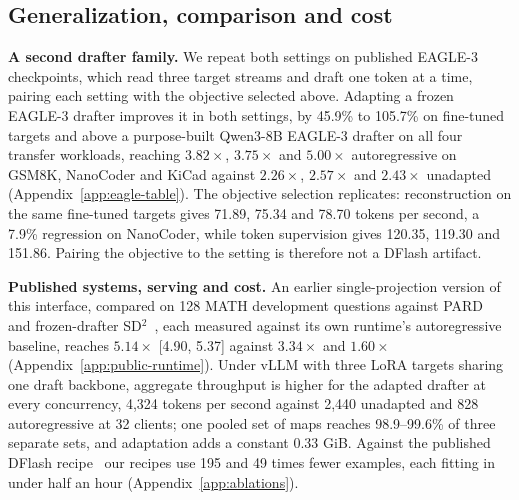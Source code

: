\subsection{Generalization, comparison and cost}
\label{sec:eagle}
\textbf{A second drafter family.} We repeat both settings on published EAGLE-3 checkpoints, which read three target streams and draft one token at a time, pairing each setting with the objective selected above. Adapting a frozen EAGLE-3 drafter improves it in both settings, by 45.9\% to 105.7\% on fine-tuned targets and above a purpose-built Qwen3-8B EAGLE-3 drafter on all four transfer workloads, reaching $3.82\times$, $3.75\times$ and $5.00\times$ autoregressive on GSM8K, NanoCoder and KiCad against $2.26\times$, $2.57\times$ and $2.43\times$ unadapted (Appendix~\ref{app:eagle-table}). The objective selection replicates: reconstruction on the same fine-tuned targets gives 71.89, 75.34 and 78.70 tokens per second, a 7.9\% regression on NanoCoder, while token supervision gives 120.35, 119.30 and 151.86. Pairing the objective to the setting is therefore not a DFlash artifact.

\textbf{Published systems, serving and cost.} An earlier single-projection version of this interface, compared on 128 MATH development questions against PARD~\citep{an2026pard} and frozen-drafter SD$^2$~\citep{berdoz2026steering}, each measured against its own runtime's autoregressive baseline, reaches $5.14\times$ [4.90, 5.37] against $3.34\times$ and $1.60\times$ (Appendix~\ref{app:public-runtime}). Under vLLM with three LoRA targets sharing one draft backbone, aggregate throughput is higher for the adapted drafter at every concurrency, 4{,}324 tokens per second against 2{,}440 unadapted and 828 autoregressive at 32 clients; one pooled set of maps reaches 98.9--99.6\% of three separate sets, and adaptation adds a constant 0.33 GiB. Against the published DFlash recipe~\citep{chen2026dflash} our recipes use 195 and 49 times fewer examples, each fitting in under half an hour (Appendix~\ref{app:ablations}).
